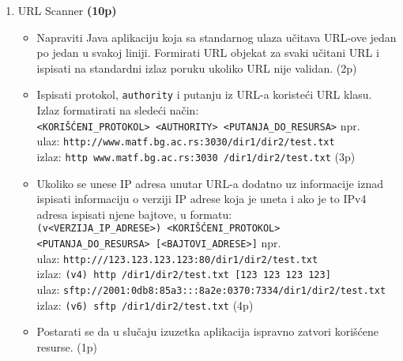 \documentclass[]{article}
\begin{document}
\begin{enumerate}
  \item URL Scanner \textbf{(10p)}
  \begin{itemize}
    \item Napraviti Java aplikaciju koja sa standarnog ulaza u\v{c}itava URL-ove jedan po jedan u svakoj liniji. Formirati URL objekat za svaki u\v{c}itani URL i ispisati na standardni izlaz poruku ukoliko URL nije validan. \hfill (2p)
    \item Ispisati protokol, \texttt{authority} i putanju iz URL-a koriste\'c{}i URL klasu. Izlaz formatirati na slede\'c{}i na\v{c}in:\\
    \texttt{<KORI\v{S}\'C{}ENI\_PROTOKOL> <AUTHORITY> <PUTANJA\_DO\_RESURSA>} npr.\\
    ulaz: \texttt{http://www.matf.bg.ac.rs:3030/dir1/dir2/test.txt} \\
    izlaz: \texttt{http www.matf.bg.ac.rs:3030 /dir1/dir2/test.txt} \hfill (3p) 
    \item Ukoliko se unese IP adresa unutar URL-a dodatno uz informacije iznad ispisati informaciju o verziji IP adrese koja je uneta i ako je to IPv4 adresa ispisati njene bajtove, u formatu:\\
    \texttt{(v<VERZIJA\_IP\_ADRESE>) <KORI\v{S}\'C{}ENI\_PROTOKOL> <PUTANJA\_DO\_RESURSA> [<BAJTOVI\_ADRESE>]} npr.\\
    ulaz: \texttt{http:///123.123.123.123:80/dir1/dir2/test.txt} \\
    izlaz: \texttt{(v4) http /dir1/dir2/test.txt [123 123 123 123]} \\ 
    ulaz: \texttt{sftp://2001:0db8:85a3:::8a2e:0370:7334/dir1/dir2/test.txt} \\
    izlaz: \texttt{(v6) sftp /dir1/dir2/test.txt} \hfill (4p) 
    \item Postarati se da u slu\v{c}aju izuzetka aplikacija ispravno zatvori kori\v{s}\'c{}ene resurse. \hfill (1p)
  \end{itemize}
\end{enumerate}
\end{document}
